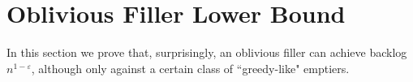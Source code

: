 



\section{Oblivious Filler Lower Bound}\label{sec:oblivious}
In this section we prove that, surprisingly, an oblivious filler
can achieve backlog $n^{1-\varepsilon}$, although only against a
certain class of ``greedy-like" emptiers.


